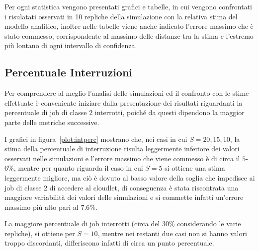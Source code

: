 Per ogni statistica vengono presentati grafici e tabelle, in cui vengono
confrontati i risulatati osservati in 10 repliche della simulazione con la
relativa stima del modello analitico, inoltre nelle tabelle viene anche indicato
l'errore massimo \epsmx che è stato commesso, corrispondente al massimo delle
distanze tra la stima e l'estremo più lontano di ogni intervallo di confidenza.
%
%
\subsection{Percentuale Interruzioni}
Per comprendere al meglio l'analisi delle simulazioni ed il confronto con le
stime effettuate è conveniente iniziare dalla presentazione dei risultati
riguardanti la percentuale di job di classe 2 interrotti, poiché da questi
dipendono la maggior parte delle metriche successive.

I grafici in figura~\ref{plot:intperc} mostrano che, nei casi in cui
$S=20,15,10$, la stima della percentuale di interruzione risulta leggermente
inferiore dei valori osservati nelle simulazioni e l'errore massimo che viene
commesso è di circa il $5$-$6\%$, mentre per quanto riguarda il caso in cui
$S=5$ si ottiene una stima leggermente migliore, ma ciò è dovuto al basso
valore della soglia che impedisce ai job di classe 2 di accedere al cloudlet, di
conseguenza è stata riscontrata una maggiore variabilità dei valori delle
simulazioni e si commette infatti un'errore massimo più alto pari al $7.6\%$.

La maggiore percentuale di job interrotti (circa del $30\%$ considerando le
varie repliche), si ottiene per $S=10$, mentre nei restanti due casi non si
hanno valori troppo discordanti, differiscono infatti di circa un punto
percentuale.

